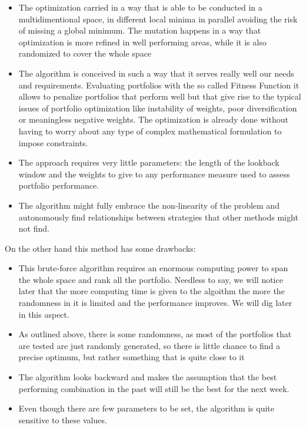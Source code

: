 \documentclass[a4paper]{article}
\numberwithin{equation}{subsection}
\begin{document}
\begin{itemize}
	\item The optimization carried in a way that is able to be conducted in a multidimentional space, in different local minima in parallel  avoiding the risk of missing a global minimum. The mutation happens in a way that optimization is more refined in well performing areas, while it is also randomized to cover the whole space
	\item The algorithm is conceived in such a way that it serves really well our needs and requirements. Evaluating portfolios with the so called Fitness Function it allows to penalize portfolios that perform well but that give rise to the typical issues of portfolio optimization like instability of weights, poor diversification or meaningless negative weights. The optimization is already done without having to worry about any type of complex mathematical formulation to impose constraints.
	\item The approach requires very little parameters: the length of the lookback window and the weights to give to any performance measure used to assess portfolio performance.
	\item The algorithm might fully embrace the non-linearity of the problem and autonomously find relationships between strategies that other methods might not find. 
\end{itemize}  

On the other hand this method has some drawbacks:

\begin{itemize}
	\item This brute-force algorithm requires an enormous computing power to span the whole space and rank all the portfolio. Needless to say, we will notice later that the more computing time is given to the algoithm the more the randomness in it is limited and the performance improves. We will dig later in this aspect. 
	\item As outlined above, there is some randomness, as most of the portfolios that are tested are just randomly generated, so there is little chance to find a precise optimum, but rather something that is quite close to it
	\item The algorithm looks backward and makes the assumption that the best performing combination in the past will still be the best for the next week.
	\item Even though there are few parameters to be set, the algorithm is quite sensitive to these values.
\end{itemize}
\end{document}
